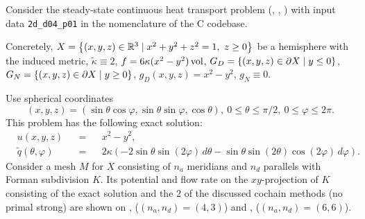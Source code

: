 \begin{example}
  \label{cmc/diffusion/continuous/steady_state/examples/2d_d04_p01-example}
  Consider the steady-state continuous heat transport problem
  (,
   ,
   )
  with input data \verb|2d_d04_p01| in the nomenclature of the C codebase.

  Concretely,
    $X = \left\{ (x, y, z) \in \mathbb{R}^3 \mid x^2 + y^2 + z^2 = 1,\ z \geq 0 \right\}$ be a
      hemisphere with the induced metric,
    $\tilde{\kappa} \equiv 2$,
    $f = 6 \kappa (x^2 - y^2) \mathop{\rm vol}\nolimits$,
    $G_D = \left\{ (x, y, z) \in \partial X \mid y \leq 0 \right\}$,
    $G_N = \left\{ (x, y, z) \in \partial X \mid y \geq 0 \right\}$,
    $g_D(x, y, z) = x^2 - y^2$,
    $g_N \equiv 0$.

  Use spherical coordinates
  \begin{equation}
    (x, y, z)
    = (\sin \theta \cos \varphi, \sin \theta \sin \varphi, \cos \theta),\
    0 \leq \theta \leq \pi / 2,\
    0 \leq \varphi \leq 2 \pi.
  \end{equation}
  This problem has the following exact solution:
  \begin{subequations}
    \begin{alignat}{3}
      & u(x, y, z) && = && x^2 - y^2, \\
      & \tilde{q}(\theta, \varphi) &&
      = && 2 \kappa (- 2 \sin \theta \sin(2 \varphi)\, d \theta
                     - \sin \theta \sin(2 \theta) \cos (2 \varphi)\, d \varphi).
    \end{alignat}
  \end{subequations}
  Consider a mesh $M$ for $X$ consisting of $n_a$ meridians and $n_d$ parallels
  with Forman subdivision $K$.
  Its potential and flow rate on the $xy$-projection of $K$ consisting of the
  exact solution and the $2$ of the discussed cochain methods (no primal strong)
  are shown on
  ,
  ($(n_a, n_d) = (4, 3)$)
  and
  ,
  ($(n_a, n_d) = (6, 6)$).
\end{example}
